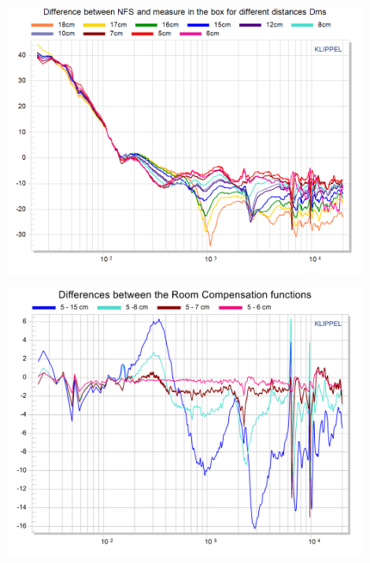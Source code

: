 \documentclass{report}
\begin{document}
\begin{minipage}{0.5\textwidth}
\begin{center}
	\includegraphics[width=0.9\textwidth]{RoomComp/MicPos_Diff_NFS_TRF} 
    \captionsetup{hypcap=false} 
	\label{fig:MicPosDiffNFS}
\end{center}
\end{minipage}
\begin{minipage}{0.5\textwidth}
\begin{center}
	\includegraphics[width=0.9\textwidth]{RoomComp/MicPos_Diff_RefMEas} 
    \captionsetup{hypcap=false} 
	\label{fig:MicPosDiffTRF}
\end{center}
\end{minipage}
\end{document}

